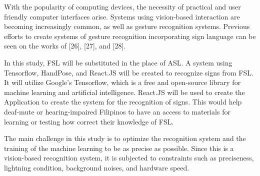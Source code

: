 \documentclass[journal]{./IEEE/IEEEtran}
\begin{document}
\par
With the popularity of computing devices, the necessity of practical and user friendly computer interfaces arise. Systems using vision-based interaction are becoming increasingly common, as well as gesture recognition systems. Previous efforts to create systems of gesture recognition incorporating sign language can be seen on the works of [26],  [27], and [28]. 
\par
In this study, FSL will be substituted in the place of ASL. A system using Tensorflow, HandPose, and React.JS will be created to recognize signs from FSL. It will utilize Google’s Tensorflow, which is a free and open-source library for machine learning and artificial intelligence. React.JS will be used to create the Application to create the system for the recognition of signs. This would help deaf-mute or hearing-impaired Filipinos to have an access to materials for learning or testing how correct their knowledge of FSL.
\par
The main challenge in this study is to optimize the recognition system and the training of the machine learning to be as precise as possible. Since this is a vision-based recognition system, it is subjected to constraints such as preciseness, lightning condition, background noises, and hardware speed.


\end{document}
